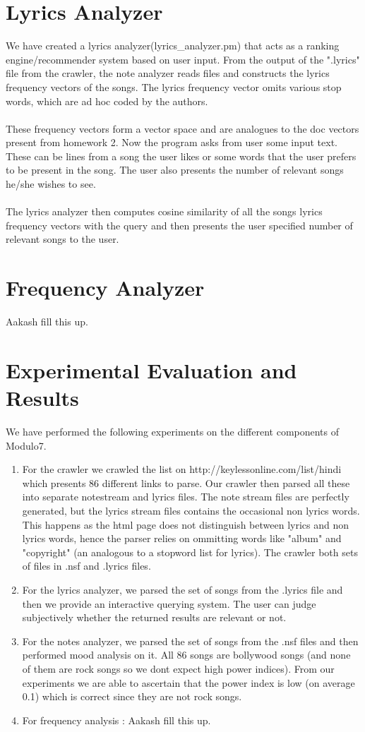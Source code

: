 \documentclass[letterpaper, 11pt]{article}
\begin{document}
\section*{Lyrics Analyzer}
We have created a lyrics analyzer(lyrics\_analyzer.pm) that acts as a ranking engine/recommender system based on user input. From the output of the ".lyrics" file from the crawler, the note analyzer reads files and constructs the lyrics frequency vectors of the songs. The lyrics frequency vector omits various stop words, which are ad hoc coded by the authors. \\\\
These frequency vectors form a vector space and are analogues to the doc vectors present from homework 2. Now the program asks from user some input text. These can be lines from a song the user likes or some words that the user prefers to be present in the song. The user also presents the number of relevant songs he/she wishes to see. \\\\
The lyrics analyzer then computes cosine similarity of all the songs lyrics frequency vectors with the query and then presents the user specified number of relevant songs to the user. 

\section*{Frequency Analyzer}
Aakash fill this up.

\section*{Experimental Evaluation and Results}
We have performed the following experiments on the different components of Modulo7.
\begin{enumerate}
\item For the crawler we crawled the list on http://keylessonline.com/list/hindi which presents 86 different links to parse. Our crawler then parsed all these into separate notestream and lyrics files. The note stream files are perfectly generated, but the lyrics stream files contains the occasional non lyrics words. This happens as the html page does not distinguish between lyrics and non lyrics words, hence the parser relies on ommitting words like "album" and "copyright" (an analogous to a stopword list for lyrics). The crawler both sets of files in .nsf and .lyrics files.
\item For the lyrics analyzer, we parsed the set of songs from the .lyrics file and then we provide an interactive querying system. The user can judge subjectively whether the returned results are relevant or not. 
\item For the notes analyzer, we parsed the set of songs from the .nsf files and then performed mood analysis on it. All 86 songs are bollywood songs (and none of them are rock songs so we dont expect high power indices). From our experiments we are able to ascertain that the power index is low (on average 0.1) which is correct since they are not rock songs. 
\item For frequency analysis : Aakash fill this up.
\end{enumerate}
\end{document}
